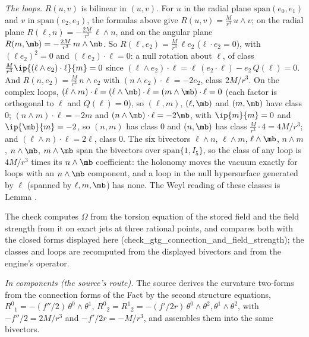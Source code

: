 \emph{The loops.} $R(u, v)$ is bilinear in $(u, v)$. For $u$ in the radial plane $\mathrm{span}(e_0, e_1)$ and $v$ in $\mathrm{span}(e_2, e_3)$, the formulas above give $R(u, v) = \tfrac{M}{r^{3}}\,u \wedge v$; on the radial plane $R(\ell, n) = -\tfrac{2M}{r^{3}}\,\ell\wedge n$, and on the angular plane $R(m, \mb) = -\tfrac{2M}{r^{3}}\,m\wedge\mb$. So $R(\ell, e_2) = \tfrac{M}{r^{3}}\,\ell e_2$ ($\ell\cdot e_2 = 0$), with $(\ell e_2)^{2} = 0$ and $(\ell e_2)\cdot\ell = 0$: a null rotation about $\ell$, of class $\tfrac{M}{r^3}\ip{(\ell\wedge e_2)\cdot\ell}{m} = 0$ since $(\ell\wedge e_2)\cdot\ell = \ell\,(e_2\cdot\ell) - e_2\,Q(\ell) = 0$. And $R(n, e_2) = \tfrac{M}{r^{3}}\,n\wedge e_2$ with $(n\wedge e_2)\cdot\ell = -2e_2$, class $2M/r^{3}$. On the complex loops, $(\ell\wedge m)\cdot\ell = (\ell\wedge\mb)\cdot\ell = (m\wedge\mb)\cdot\ell = 0$ (each factor is orthogonal to $\ell$ and $Q(\ell) = 0$), so $(\ell, m)$, $(\ell, \mb)$ and $(m, \mb)$ have class $0$; $(n\wedge m)\cdot\ell = -2m$ and $(n\wedge\mb)\cdot\ell = -2\mb$, with $\ip{m}{m} = 0$ and $\ip{\mb}{m} = -2$, so $(n, m)$ has class $0$ and $(n, \mb)$ has class $\tfrac{M}{r^{3}}\cdot 4 = 4M/r^{3}$; and $(\ell\wedge n)\cdot\ell = 2\ell$, class $0$. The six bivectors $\ell\wedge n$, $\ell\wedge m$, $\ell\wedge\mb$, $n\wedge m$, $n\wedge\mb$, $m\wedge\mb$ span the bivectors over $\mathrm{span}\{1, I_5\}$, so the class of any loop is $4M/r^{3}$ times its $n\wedge\mb$ coefficient: the holonomy moves the vacuum exactly for loops with an $n\wedge\mb$ component, and a loop in the null hypersurface generated by $\ell$ (spanned by $\ell, m, \mb$) has none. The Weyl reading of these classes is Lemma .

The check computes $\Omega$ from the torsion equation of the stored field and the field strength from it on exact jets at three rational points, and compares both with the closed forms displayed here (check\_gtg\_connection\_and\_field\_strength); the classes and loops are recomputed from the displayed bivectors and from the engine's operator.

\emph{In components (the source's route).} The source derives the curvature two-forms from the connection forms of the Fact by the second structure equations, $R^{0}{}_{1} = -(f''/2)\,\theta^{0}\wedge\theta^{1}$, $R^{0}{}_{2} = R^{1}{}_{2} = -(f'/2r)\,\theta^{0}\wedge\theta^{2}, \theta^{1}\wedge\theta^{2}$, with $-f''/2 = 2M/r^{3}$ and $-f'/2r = -M/r^{3}$, and assembles them into the same bivectors.
